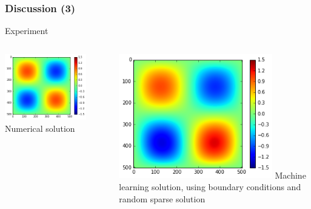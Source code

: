 \documentclass[mathserif,10pt]{beamer}
\newcommand{\inStructColor}[1]{\textcolor{MyNewDelftBlue}{#1}}
\begin{document}
\begin{frame}
\frametitle{Discussion (3)}
\begin{block}{Experiment}
\begin{columns}
\begin{column}[b]{0.49\textwidth}
\begin{center}
\includegraphics[width=0.8\textwidth]{graphics/FD.png} 
\newline
\inStructColor{Numerical solution} 
\phantom{using boundary conditions and random sparse solution}
\phantom{using boundary conditions and random sparse solution}
\end{center}
\end{column}
\begin{column}[b]{0.49\textwidth}
\includegraphics[width=0.8\textwidth]{graphics/GP.png}
\newline
\inStructColor{Machine learning solution, using boundary conditions and random sparse solution}
\end{column}
\end{columns}
\end{block}
\end{frame}
\end{document}

